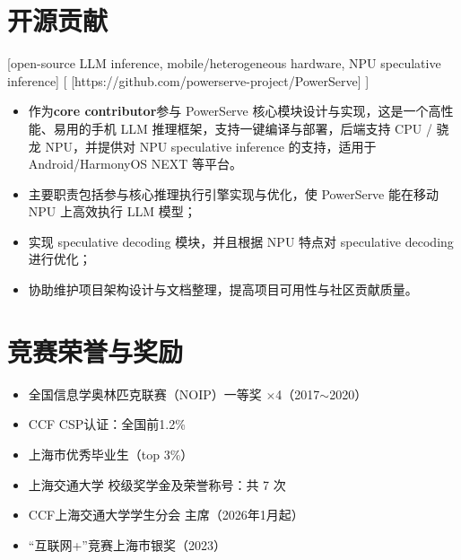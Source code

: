 \documentclass{chicv}
\begin{document}
\section{开源贡献}
[open-source LLM inference, mobile/heterogeneous hardware, NPU speculative inference]
[
[https://github.com/powerserve-project/PowerServe]
]
\begin{itemize}
  \item 作为\textbf{core contributor}参与 PowerServe 核心模块设计与实现，这是一个高性能、易用的手机 LLM 推理框架，支持一键编译与部署，后端支持 CPU / 骁龙 NPU，并提供对 NPU speculative inference 的支持，适用于 Android/HarmonyOS NEXT 等平台。
  \item 主要职责包括参与核心推理执行引擎实现与优化，使 PowerServe 能在移动 NPU 上高效执行 LLM 模型；
  \item 实现 speculative decoding 模块，并且根据 NPU 特点对 speculative decoding 进行优化；
  \item 协助维护项目架构设计与文档整理，提高项目可用性与社区贡献质量。
\end{itemize}

\section{竞赛荣誉与奖励}
\begin{itemize}
  \item 全国信息学奥林匹克联赛（NOIP）一等奖 $\times$4（2017$\sim$2020）
  \item CCF CSP认证：全国前1.2\%
  \item 上海市优秀毕业生（top 3\%）
  \item 上海交通大学 校级奖学金及荣誉称号：共 7 次
  \item CCF上海交通大学学生分会 主席（2026年1月起）
  \item “互联网+”竞赛上海市银奖（2023）
\end{itemize}
\end{document}

